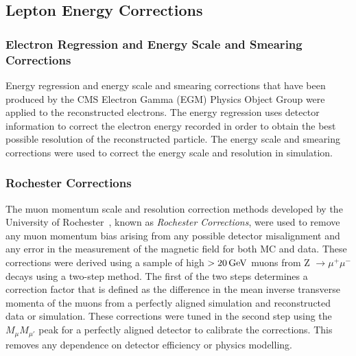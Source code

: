 

\subsection{Lepton Energy Corrections}\label{subsec:leptonEnergyCorrections}
\subsubsection{Electron Regression and Energy Scale and Smearing Corrections}
Energy regression and energy scale and smearing corrections that have been produced by the CMS Electron Gamma (EGM) Physics Object Group were applied to the reconstructed electrons.
The energy regression uses detector information to correct the electron energy recorded in order to obtain the best possible resolution of the reconstructed particle.
The energy scale and smearing corrections were used to correct the energy scale and resolution in simulation.

\subsubsection{Rochester Corrections}
The muon momentum scale and resolution correction methods developed by the University of Rochester~\cite{rochester}, known as \emph{Rochester Corrections}, were used to remove any muon momentum bias arising from any possible detector misalignment and any error in the measurement of the magnetic field for both MC and data.
These corrections were derived using a sample of high \pt $> 20\,\text{Ge\hspace{-.08em}V}$ muons from Z $ \rightarrow \mu^{+}\mu^{-}$ decays using a two-step method.
The first of the two steps determines a correction factor that is defined as the difference in the mean inverse transverse momenta of the muons from a perfectly aligned simulation and reconstructed data or simulation.
These corrections were tuned in the second step using the $M_{\mu}M_{\mu\prime}$ peak for a perfectly aligned detector to calibrate the corrections.
This removes any dependence on detector efficiency or physics modelling.


